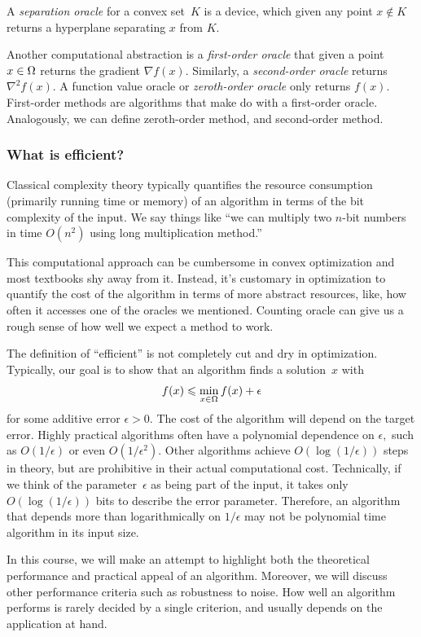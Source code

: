 \begin{definition}
A \emph{separation oracle} for a convex set~$K$ is a device, which given any
point $x\not\in K$ returns a hyperplane separating $x$ from $K.$
\end{definition}

Another computational abstraction is a \emph{first-order oracle} that given a
point $x\in\Omega$ returns the gradient $\nabla f(x).$ Similarly, a
\emph{second-order oracle} returns $\nabla^2 f(x).$ A function value oracle or
\emph{zeroth-order oracle} only returns $f(x).$ First-order methods are
algorithms that make do with a first-order oracle.  Analogously, we can define
zeroth-order method, and second-order method.

\subsubsection{What is efficient?}
Classical complexity theory typically quantifies the resource consumption
(primarily running time or memory) of an algorithm in terms of the bit
complexity of the input. We say things like ``we can multiply two $n$-bit
numbers in time $O(n^2)$ using long multiplication method.''

This computational approach can be cumbersome in convex optimization and most
textbooks shy away from it. Instead, it's customary in optimization to quantify
the cost of the algorithm in terms of more abstract resources, like, how often
it accesses one of the oracles we mentioned. Counting oracle can give us a rough
sense of how well we expect a method to work.

The definition of ``efficient'' is not completely cut and dry in optimization.
Typically, our goal is to show that an algorithm finds a solution~$x$ with 
\[
f(x) \leqslant \min_{x\in\Omega}f(x) + \epsilon
\]
for some additive error $\epsilon>0.$ 
The
cost of the algorithm will depend on the target error.  Highly practical
algorithms often have a polynomial dependence on $\epsilon,$ such as
$O(1/\epsilon)$ or even $O(1/\epsilon^2).$ Other algorithms achieve
$O(\log(1/\epsilon))$ steps in theory, but are prohibitive in their actual
computational cost. Technically, if we think of the parameter~$\epsilon$ as
being part of the input, it takes only $O(\log(1/\epsilon))$ bits to describe
the error parameter. Therefore, an algorithm that depends more than
logarithmically on $1/\epsilon$ may not be polynomial time algorithm in its
input size.

In this course, we will make an attempt to highlight both the theoretical performance and practical appeal of an algorithm. Moreover, we will discuss other performance criteria such as robustness to noise. How well an algorithm performs is rarely decided by a single criterion, and usually depends on the application at hand.
